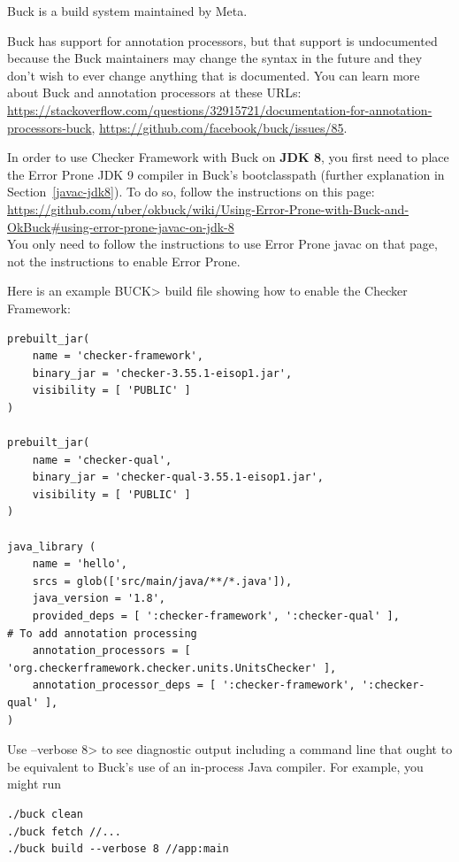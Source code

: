 
Buck is a build system maintained by Meta.

Buck has support for annotation processors, but that support is
undocumented because the Buck maintainers may change the syntax in the
future and they don't wish to ever change anything that is documented.
You can learn more about Buck and annotation processors at these URLs:
{\codesize\url{https://stackoverflow.com/questions/32915721/documentation-for-annotation-processors-buck}},
{\codesize\url{https://github.com/facebook/buck/issues/85}}.

In order to use Checker Framework with Buck on \textbf{JDK 8}, you first need
to place the Error Prone JDK 9 compiler in Buck's bootclasspath
(further explanation in Section~\ref{javac-jdk8}).  To do so,
follow the instructions on this page: \\
{\codesize\url{https://github.com/uber/okbuck/wiki/Using-Error-Prone-with-Buck-and-OkBuck#using-error-prone-javac-on-jdk-8}} \\
You only need to follow the instructions to use Error Prone javac on
that page, not the instructions to enable Error Prone.

Here is an example \<BUCK> build
file showing how to enable the Checker Framework:

\begin{Verbatim}
prebuilt_jar(
    name = 'checker-framework',
    binary_jar = 'checker-3.55.1-eisop1.jar',
    visibility = [ 'PUBLIC' ]
)

prebuilt_jar(
    name = 'checker-qual',
    binary_jar = 'checker-qual-3.55.1-eisop1.jar',
    visibility = [ 'PUBLIC' ]
)

java_library (
    name = 'hello',
    srcs = glob(['src/main/java/**/*.java']),
    java_version = '1.8',
    provided_deps = [ ':checker-framework', ':checker-qual' ],
# To add annotation processing
    annotation_processors = [ 'org.checkerframework.checker.units.UnitsChecker' ],
    annotation_processor_deps = [ ':checker-framework', ':checker-qual' ],
)
\end{Verbatim}



Use \<--verbose 8> to see diagnostic output including a command line that
ought to be equivalent to Buck's use of an in-process Java compiler.
For example, you might run

\begin{Verbatim}
./buck clean
./buck fetch //...
./buck build --verbose 8 //app:main
\end{Verbatim}

